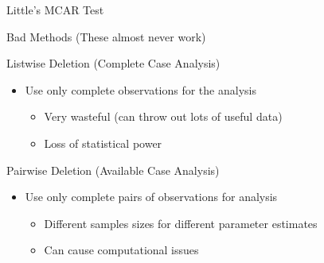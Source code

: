 \documentclass{beamer}\usepackage[]{graphicx}\usepackage[]{color}
\begin{document}

\begin{frame}{Little's MCAR Test}
  
\end{frame}




\begin{frame}{Bad Methods (These almost never work)}
   
  Listwise Deletion (Complete Case Analysis)
  \begin{itemize}
  \item Use only complete observations for the analysis
    \begin{itemize}
    \item Very wasteful (can throw out lots of useful data)
    \item Loss of statistical power
    \end{itemize}
  \end{itemize}

  \va
  
  Pairwise Deletion (Available Case Analysis)
  \begin{itemize}
  \item Use only complete pairs of observations for analysis
    \begin{itemize}
    \item Different samples sizes for different parameter estimates
    \item Can cause computational issues 
    \end{itemize}
  \end{itemize}
  
\end{frame}

\watermarkoff %
\end{document}
